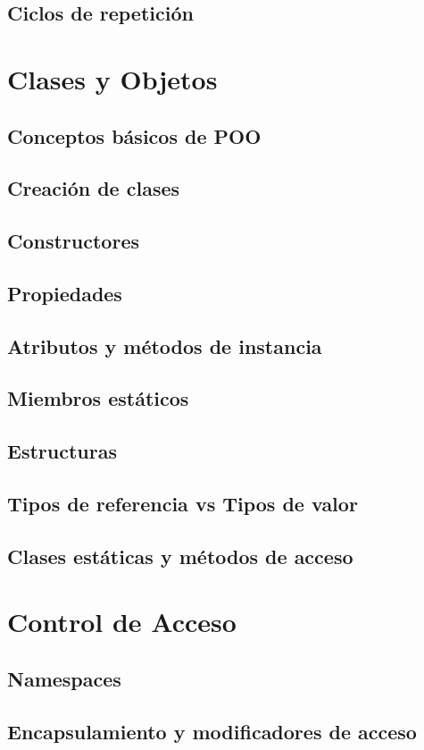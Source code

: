 \documentclass[12pt,a4paper]{report}
\begin{document}
{\section{Ciclos de repetición}

\chapter{Clases y Objetos}
\section{Conceptos básicos de POO}
\section{Creación de clases}
\section{Constructores}
\section{Propiedades}
\section{Atributos y métodos de instancia}
\section{Miembros estáticos}
\section{Estructuras}
\section{Tipos de referencia vs Tipos de valor}
\section{Clases estáticas y métodos de acceso}

\chapter{Control de Acceso}
\section{Namespaces}
\section{Encapsulamiento y modificadores de acceso}
}
\end{document}
